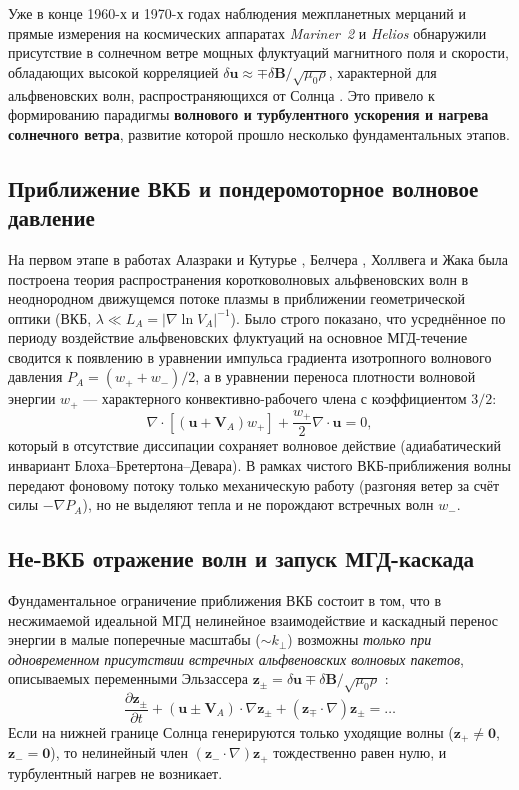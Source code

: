 \documentclass[11pt,a4paper]{article}
\begin{document}
Уже в конце 1960-х и 1970-х годах наблюдения межпланетных мерцаний и прямые измерения на космических аппаратах \emph{Mariner~2} и \emph{Helios} обнаружили присутствие в солнечном ветре мощных флуктуаций магнитного поля и скорости, обладающих высокой корреляцией $\delta\bm{u} \approx \mp \delta\bm{B}/\sqrt{\mu_0\rho}$, характерной для альфвеновских волн, распространяющихся от Солнца \cite{BelcherDavis1971}. Это привело к формированию парадигмы \textbf{волнового и турбулентного ускорения и нагрева солнечного ветра}, развитие которой прошло несколько фундаментальных этапов.

\subsection{Приближение ВКБ и пондеромоторное волновое давление}

На первом этапе в работах Алазраки и Кутурье \cite{Alazraki1971}, Белчера \cite{Belcher1971}, Холлвега \cite{Hollweg1973,Hollweg1978} и Жака \cite{Jacques1977} была построена теория распространения коротковолновых альфвеновских волн в неоднородном движущемся потоке плазмы в приближении геометрической оптики (ВКБ, $\lambda \ll L_A = |\nabla\ln V_A|^{-1}$). Было строго показано, что усреднённое по периоду воздействие альфвеновских флуктуаций на основное МГД-течение сводится к появлению в уравнении импульса градиента изотропного волнового давления $P_A = (w_+ + w_-)/2$, а в уравнении переноса плотности волновой энергии $w_+$ --- характерного конвективно-рабочего члена с коэффициентом $3/2$:
\[
\nabla\cdot\left[(\bm{u} + \bm{V}_A)w_+\right] + \frac{w_+}{2}\nabla\cdot\bm{u} = 0,
\]
который в отсутствие диссипации сохраняет волновое действие (адиабатический инвариант Блоха--Бретертона--Девара). В рамках чистого ВКБ-приближения волны передают фоновому потоку только механическую работу (разгоняя ветер за счёт силы $-\nabla P_A$), но не выделяют тепла и не порождают встречных волн $w_-$.

\subsection{Не-ВКБ отражение волн и запуск МГД-каскада}

Фундаментальное ограничение приближения ВКБ состоит в том, что в несжимаемой идеальной МГД нелинейное взаимодействие и каскадный перенос энергии в малые поперечные масштабы ($\sim k_\perp$) возможны \emph{только при одновременном присутствии встречных альфвеновских волновых пакетов}, описываемых переменными Эльзассера $\bm{z}_\pm = \delta\bm{u} \mp \delta\bm{B}/\sqrt{\mu_0\rho}$ \cite{Kraichnan1965,Dobrowolny1980}:
\[
\frac{\partial\bm{z}_\pm}{\partial t} + (\bm{u} \pm \bm{V}_A)\cdot\nabla\bm{z}_\pm + (\bm{z}_\mp\cdot\nabla)\bm{z}_\pm = \dots
\]
Если на нижней границе Солнца генерируются только уходящие волны ($\bm{z}_+ \neq \bm{0}$, $\bm{z}_- = \bm{0}$), то нелинейный член $(\bm{z}_-\cdot\nabla)\bm{z}_+$ тождественно равен нулю, и турбулентный нагрев не возникает.
\end{document}
